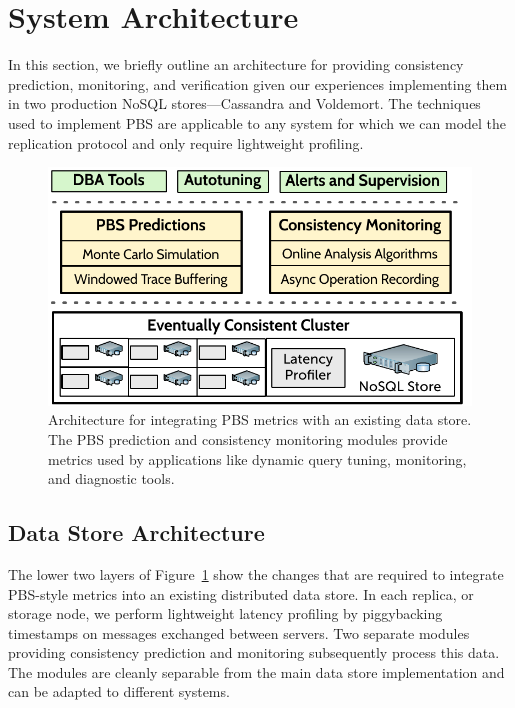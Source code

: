 \section{System Architecture}
\label{sec:architecture}

In this section, we briefly outline an architecture for providing
consistency prediction, monitoring, and verification given our
experiences implementing them in two production NoSQL
stores---Cassandra and Voldemort. The techniques used to implement PBS
are applicable to any system for which we can model the replication
protocol and only require lightweight profiling.


\begin{figure}
\centering
\includegraphics[width=\columnwidth]{figs/cluster-arch.pdf}
\caption{Architecture for integrating PBS metrics with an existing
  data store. The PBS prediction and consistency monitoring modules
  provide metrics used by applications like dynamic
  query tuning, monitoring, and diagnostic tools.}\vspace{-1em}
\label{fig:pbs-sys-arch}
\end{figure}


\subsection{Data Store Architecture}
\label{sec:dbarch}

The lower two layers of Figure~\ref{fig:pbs-sys-arch} show the changes
that are required to integrate PBS-style metrics into an existing
distributed data store. In each replica, or storage node, we perform
lightweight latency profiling by piggybacking timestamps on messages
exchanged between servers. Two separate modules providing consistency
prediction and monitoring subsequently process this data. The
modules are cleanly separable from the main data store implementation
and can be adapted to different systems.\\

